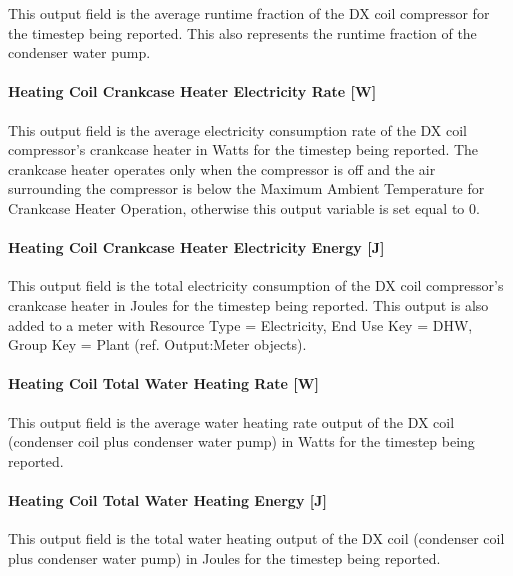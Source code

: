 This output field is the average runtime fraction of the DX coil compressor for the timestep being reported. This also represents the runtime fraction of the condenser water pump.

\paragraph{Heating Coil Crankcase Heater Electricity Rate {[}W{]}}\label{heating-coil-crankcase-heater-electric-powerw-2}

This output field is the average electricity consumption rate of the DX coil compressor's crankcase heater in Watts for the timestep being reported. The crankcase heater operates only when the compressor is off and the air surrounding the compressor is below the Maximum Ambient Temperature for Crankcase Heater Operation, otherwise this output variable is set equal to 0.

\paragraph{Heating Coil Crankcase Heater Electricity Energy {[}J{]}}\label{heating-coil-crankcase-heater-electric-energy-j-3}

This output field is the total electricity consumption of the DX coil compressor's crankcase heater in Joules for the timestep being reported. This output is also added to a meter with Resource Type = Electricity, End Use Key = DHW, Group Key = Plant (ref. Output:Meter objects).

\paragraph{Heating Coil Total Water Heating Rate {[}W{]}}\label{heating-coil-total-water-heating-rate-w-1}

This output field is the average water heating rate output of the DX coil (condenser coil plus condenser water pump) in Watts for the timestep being reported.

\paragraph{Heating Coil Total Water Heating Energy {[}J{]}}\label{heating-coil-total-water-heating-energy-j-1}

This output field is the total water heating output of the DX coil (condenser coil plus condenser water pump) in Joules for the timestep being reported.

